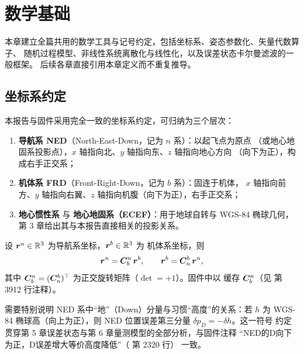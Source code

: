 \section{数学基础}

本章建立全篇共用的数学工具与记号约定，包括坐标系、姿态参数化、矢量代数算子、
随机过程模型、非线性系统离散化与线性化，以及误差状态卡尔曼滤波的一般框架。
后续各章直接引用本章定义而不重复推导。

\subsection{坐标系约定}

本报告与固件采用完全一致的坐标系约定，可归纳为三个层次：
\begin{enumerate}
  \item \textbf{导航系 NED}（North-East-Down，记为 $n$ 系）：以起飞点为原点
    （或地心地固系投影点），$x$ 轴指向北、$y$ 轴指向东、$z$ 轴指向地心方向
    （向下为正），构成右手正交系；
  \item \textbf{机体系 FRD}（Front-Right-Down，记为 $b$ 系）：固连于机体，
    $x$ 轴指向前方、$y$ 轴指向右翼、$z$ 轴指向机腹（向下为正），右手正交系；
  \item \textbf{地心惯性系} 与 \textbf{地心地固系（ECEF）}：用于地球自转与
    WGS-84 椭球几何，第 3 章给出其与本报告直接相关的投影关系。
\end{enumerate}

\begin{definition}[方向余弦矩阵]
设 $\boldsymbol{r}^n \in \mathbb{R}^3$ 为导航系坐标，$\boldsymbol{r}^b \in \mathbb{R}^3$ 为
机体系坐标，则
\begin{equation}
  \boldsymbol{r}^n = \boldsymbol{C}_b^n\, \boldsymbol{r}^b, \qquad
  \boldsymbol{r}^b = \boldsymbol{C}_n^b\, \boldsymbol{r}^n,
  \label{eq:dcm-def}
\end{equation}
其中 $\boldsymbol{C}_b^n = (\boldsymbol{C}_n^b)^{\top}$ 为正交旋转矩阵（$\det = +1$）。固件中以
 缓存 $\boldsymbol{C}_b^n$（见  第 3912 行注释）。
\end{definition}

需要特别说明 NED 系中``地''（Down）分量与习惯``高度''的关系：若 $h$ 为 WGS-84
椭球高（向上为正），则 NED 位置误差第三分量 $\delta p_D = -\delta h$。这一符号
约定贯穿第 5 章误差状态与第 6 章量测模型的全部分析，与固件注释
``NED的D向下为正，D误差增大等价高度降低''（ 第 2320 行）
一致。

